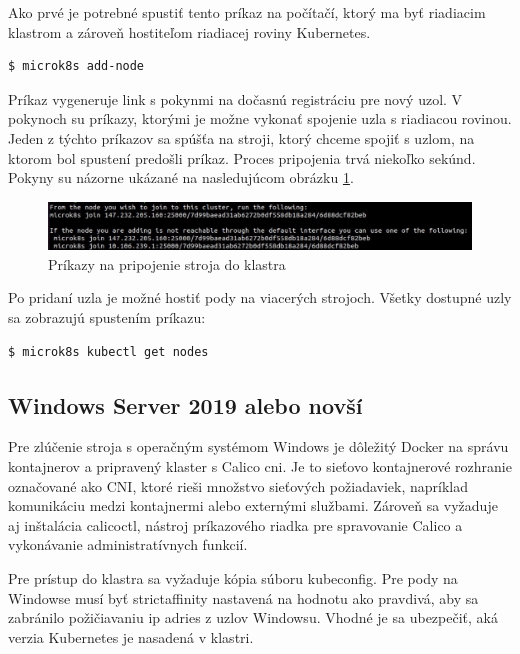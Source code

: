Ako prvé je potrebné spustiť tento príkaz na počítačí, ktorý ma byť riadiacim klastrom a zároveň hostiteľom riadiacej roviny Kubernetes.

\begin{lstlisting}[language=Bash]
    $ microk8s add-node
    \end{lstlisting}

Príkaz vygeneruje link s pokynmi na dočasnú registráciu pre nový uzol. V pokynoch su príkazy, ktorými je možne vykonať spojenie uzla s riadiacou rovinou. Jeden z týchto príkazov sa spúšťa na stroji, ktorý chceme spojiť s uzlom, na ktorom bol spustení predošli príkaz. Proces pripojenia trvá niekoľko sekúnd. Pokyny su názorne ukázané na nasledujúcom obrázku \ref{pripojenie}.

\begin{figure}[!h]
    \centering
    \includegraphics[width=1\linewidth]{figures/addnode}
    \caption{Príkazy na pripojenie stroja do klastra}
    \label{pripojenie}
\end{figure}


Po pridaní uzla je možné hostiť pody na viacerých strojoch. Všetky dostupné uzly sa zobrazujú spustením príkazu:

\begin{lstlisting}[language=Bash]
    $ microk8s kubectl get nodes
    \end{lstlisting}

\subsection*{Windows Server 2019 alebo novší}

Pre zlúčenie stroja s operačným systémom Windows je dôležitý Docker na správu kontajnerov a pripravený klaster s Calico \acrshort{cni}. Je to sieťovo kontajnerové rozhranie označované ako CNI, ktoré rieši množstvo sieťových požiadaviek, napríklad komunikáciu medzi kontajnermi alebo externými službami. Zároveň sa vyžaduje aj inštalácia calicoctl, nástroj príkazového riadka pre spravovanie Calico a vykonávanie administratívnych funkcií.

Pre prístup do klastra sa vyžaduje kópia súboru kubeconfig. Pre pody na Windowse musí byť strictaffinity nastavená na hodnotu ako pravdivá, aby sa zabránilo požičiavaniu \acrshort{ip} adries z uzlov Windowsu. Vhodné je sa ubezpečiť, aká verzia Kubernetes je nasadená v klastri.

